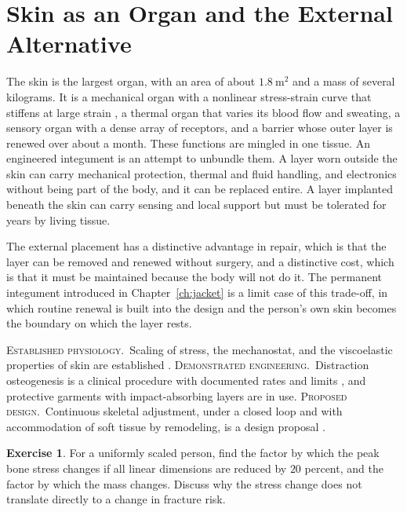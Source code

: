 \documentclass[11pt,openany]{book}
\theoremstyle{definition}
\newtheorem{exercise}{Exercise}[chapter]
\theoremstyle{remark}
\newcommand{\est}{\textsc{Established physiology.}\ }
\newcommand{\dem}{\textsc{Demonstrated engineering.}\ }
\newcommand{\pro}{\textsc{Proposed design.}\ }
\begin{document}
\section{Skin as an Organ and the External Alternative}

The skin is the largest organ, with an area of about $1.8\ \mathrm{m^{2}}$ and a mass of several kilograms. It is a mechanical organ with a nonlinear stress-strain curve that stiffens at large strain \cite{silver2001}, a thermal organ that varies its blood flow and sweating, a sensory organ with a dense array of receptors, and a barrier whose outer layer is renewed over about a month. These functions are mingled in one tissue. An engineered integument is an attempt to unbundle them. A layer worn outside the skin can carry mechanical protection, thermal and fluid handling, and electronics without being part of the body, and it can be replaced entire. A layer implanted beneath the skin can carry sensing and local support but must be tolerated for years by living tissue.

The external placement has a distinctive advantage in repair, which is that the layer can be removed and renewed without surgery, and a distinctive cost, which is that it must be maintained because the body will not do it. The permanent integument introduced in Chapter~\ref{ch:jacket} is a limit case of this trade-off, in which routine renewal is built into the design and the person's own skin becomes the boundary on which the layer rests.

\begin{evidence}
\est Scaling of stress, the mechanostat, and the viscoelastic properties of skin are established \cite{frost1987,silver2001,schmidtnielsen1984}. \dem Distraction osteogenesis is a clinical procedure with documented rates and limits \cite{ilizarov1989}, and protective garments with impact-absorbing layers are in use. \pro Continuous skeletal adjustment, under a closed loop and with accommodation of soft tissue by remodeling, is a design proposal \cite{flyxion2026cm}.
\end{evidence}

\begin{exercise}
For a uniformly scaled person, find the factor by which the peak bone stress changes if all linear dimensions are reduced by $20$ percent, and the factor by which the mass changes. Discuss why the stress change does not translate directly to a change in fracture risk.
\end{exercise}
\end{document}

